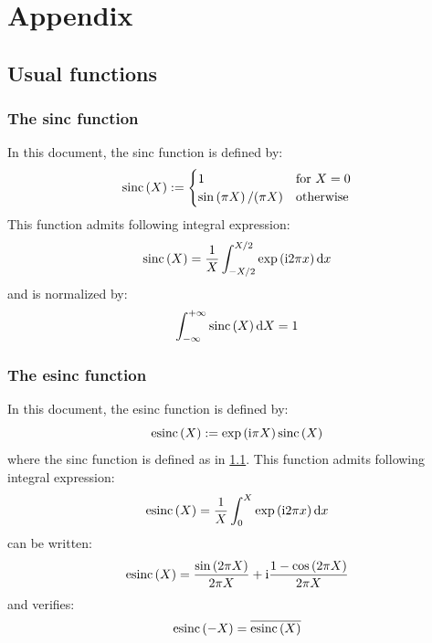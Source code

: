 \documentclass[10pt,a4paper,twoside,openany]{book}
\begin{document}
\part{Appendix}

\chapter{Usual functions}

\section{The sinc function}
\label{sinc}

In this document, the sinc function is defined by:
\begin{equation*}
\mathrm{sinc} \left( {X} \right) := \begin{cases}
1 & \text{for $X = 0$} \\
\mathrm{sin} \left( {\pi X} \right) / ( \pi X ) & \text{otherwise}
\end{cases}
\end{equation*}
This function admits following integral expression:
\begin{equation*}
\mathrm{sinc} \left( {X} \right) = \frac 1 X \int_{-X/2}^{X/2} \mathrm{exp} \left( {\mathrm{i} 2 \pi x} \right) \mathrm dx
\end{equation*}
and is normalized by:
\begin{equation*}
\int_{-\infty}^{+\infty} \mathrm{sinc} \left( {X} \right) \mathrm dX = 1
\end{equation*}

\section{The esinc function}
\label{esinc}

In this document, the esinc function is defined by:
\begin{equation*}
\mathrm{esinc} \left( {X} \right) := \mathrm{exp} \left( {\mathrm{i} \pi X} \right) \mathrm{sinc} \left( {X} \right)
\end{equation*}
where the sinc function is defined as in \ref{sinc}. This function admits following integral expression:
\begin{equation*}
\mathrm{esinc} \left( {X} \right) = \frac 1 X \int_0^X \mathrm{exp} \left( {\mathrm{i} 2 \pi x} \right) \mathrm dx
\end{equation*}
can be written:
\begin{equation*}
\mathrm{esinc} \left( {X} \right) = \frac{\mathrm{sin} \left( {2 \pi X} \right)}{2 \pi X} + \mathrm{i} \frac{1 - \mathrm{cos} \left( {2 \pi X} \right)}{2 \pi X}
\end{equation*}
and verifies:
\begin{equation*}
\mathrm{esinc} \left( {-X} \right) = \overline{\mathrm{esinc} \left( {X} \right)}
\end{equation*}
\end{document}

